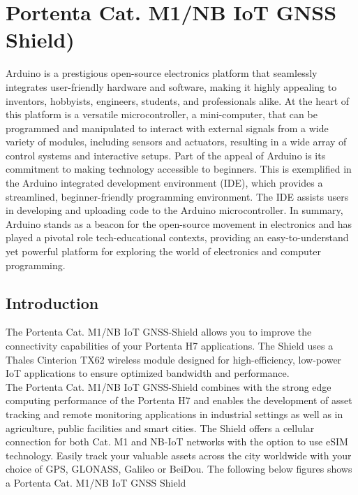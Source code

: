 
%
%
%
%


\chapter{Portenta Cat. M1/NB IoT GNSS Shield)}


Arduino is a prestigious open-source electronics platform that seamlessly integrates user-friendly hardware and software, making it highly appealing to inventors, hobbyists, engineers, students, and professionals alike. At the heart of this platform is a versatile microcontroller, a mini-computer, that can be programmed and manipulated to interact with external signals from a wide variety of modules, including sensors and actuators, resulting in a wide array of control systems and interactive setups. \cite{Arduino2024Guide} 
\newline
Part of the appeal of Arduino is its commitment to making technology accessible to beginners. This is exemplified in the Arduino integrated development environment (IDE), which provides a streamlined, beginner-friendly programming environment. The IDE assists users in developing and uploading code to the Arduino microcontroller.
In summary, Arduino stands as a beacon for the open-source movement in electronics and has played a pivotal role tech-educational contexts, providing an easy-to-understand yet powerful platform for exploring the world of electronics and computer programming. \cite{Arduino2024Guide}

\section{Introduction}
The Portenta Cat. M1/NB IoT GNSS-Shield allows you to improve the connectivity capabilities of your Portenta H7 applications. The Shield uses a Thales Cinterion TX62 wireless module designed for high-efficiency, low-power IoT applications to ensure optimized bandwidth and performance. 
\\The Portenta Cat. M1/NB IoT GNSS-Shield combines with the strong edge computing performance of the Portenta H7 and enables the development of asset tracking and remote monitoring applications in industrial settings as well as in agriculture, public facilities and smart cities. The Shield offers a cellular connection for both Cat. M1 and NB-IoT networks with the option to use eSIM technology. Easily track your valuable assets across the city worldwide with your choice of GPS, GLONASS, Galileo or BeiDou.
\newline
The following below figures shows a Portenta Cat. M1/NB IoT GNSS Shield \cite{ArduinoPortentaStore:2024}

